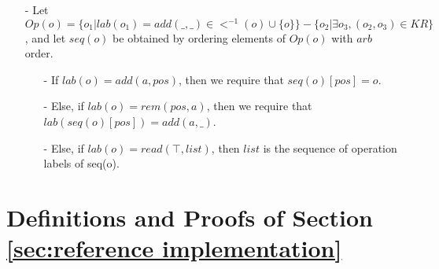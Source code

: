 {\begin{itemize}
    \begin{itemize}
    \setlength{\itemsep}{0.5pt}
    \item[-] Let $O_k = O_k \cup \{ o_1 \}$, where $<^{-1}(o_1) \subseteq O_k$.

    \item[-] Let $O_r$ be the set of $rem$ operations in $<^{-1}(o_1)$. %

    \item[-] Let $Op(o_1) = \{ o_2 \vert lab(o_2)=add(\_,\_) \in <^{-1}(o_1) \cup \{ o_1 \} \} - \{ o_3 \vert \exists o_4, (o_3,o_4) \in KR \}$. Let $seq(o_1)$ be obtained by ordering elements of $Op(o_1)$ with $arb$ order.

    \item[-] If $lab(o_1) = rem(pos,a)$, then we require that $lab(seq(o_1)[pos])=add(a,\_)$, and change $KR$ into $KR \cup \{ (seq(o_1)[pos],o_1) \}$.

    \item[-] Else, if $lab(o_1) = add(a,pos)$, then we require that $seq(o_1)[pos] = o_1$.
    \end{itemize}

    We require that this procedure be terminated with $O_k = O$.

\item[-] {\color {red}Let $Op(o) = \{ o_1 \vert lab(o_1)=add(\_,\_) \in <^{-1}(o) \cup \{ o \} \} - \{ o_2 \vert \exists o_3, (o_2,o_3) \in KR \}$, and let $seq(o)$ be obtained by ordering elements of $Op(o)$ with $arb$ order.}

    \begin{itemize}
    \setlength{\itemsep}{0.5pt}
    \item[-] If $lab(o)=add(a,pos)$, then we require that $seq(o)[pos]=o$.

    \item[-] Else, if $lab(o)=rem(pos,a)$, then we require that $lab(seq(o)[pos]) = add(a,\_)$.

    \item[-] Else, if $lab(o)=read(\top,list)$, then $list$ is the sequence of operation labels of seq(o).
    \end{itemize}
\end{itemize}


\section{Definitions and Proofs of Section \ref{sec:reference implementation}}
\label{sec:appendix definitions and proofs of section reference implementation}




}
